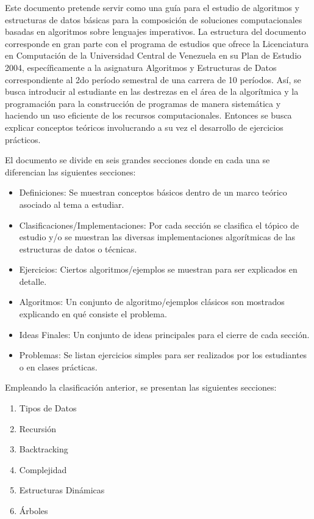 
Este documento pretende servir como una guía para el estudio de algoritmos y estructuras de datos básicas para la composición de soluciones computacionales basadas en algoritmos sobre lenguajes imperativos. La estructura del documento corresponde en gran parte con el programa de estudios que ofrece la Licenciatura en Computación de la Universidad Central de Venezuela en su Plan de Estudio 2004, específicamente a la asignatura Algoritmos y Estructuras de Datos correspondiente al 2do período semestral de una carrera de 10 períodos. Así, se busca introducir al estudiante en las destrezas en el área de la algorítmica y la programación para la construcción de programas de manera sistemática y haciendo un uso eficiente de los recursos computacionales. Entonces se busca explicar conceptos teóricos involucrando a su vez el desarrollo de ejercicios prácticos.

El documento se divide en seis grandes secciones donde en cada una se diferencian las siguientes secciones:
\begin{itemize}
\item Definiciones: Se muestran conceptos básicos dentro de un marco teórico asociado al tema a estudiar.
\item Clasificaciones/Implementaciones: Por cada sección se clasifica el tópico de estudio y/o se muestran las diversas implementaciones algorítmicas de las estructuras de datos o técnicas.
\item Ejercicios: Ciertos algoritmos/ejemplos se muestran para ser explicados en detalle.
\item Algoritmos: Un conjunto de algoritmo/ejemplos clásicos son mostrados explicando en qué consiste el problema.
\item Ideas Finales: Un conjunto de ideas principales para el cierre de cada sección.
\item Problemas: Se listan ejercicios simples para ser realizados por los estudiantes o en clases prácticas.
\end{itemize}

Empleando la clasificación anterior, se presentan las siguientes secciones:

\begin{enumerate}
\item Tipos de Datos
\item Recursión
\item Backtracking
\item Complejidad
\item Estructuras Dinámicas
\item Árboles
\end{enumerate}

